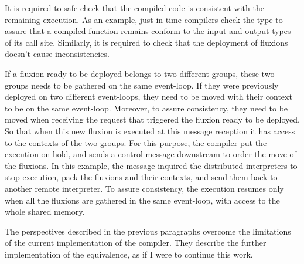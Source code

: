 It is required to safe-check that the compiled code is consistent with the remaining execution.
As an example, just-in-time compilers check the type to assure that a compiled function remains conform to the input and output types of its call site.
Similarly, it is required to check that the deployment of fluxions doesn't cause inconsistencies.

If a fluxion ready to be deployed belongs to two different groups, these two groups needs to be gathered on the same event-loop.
If they were previously deployed on two different event-loops, they need to be moved with their context to be on the same event-loop.
Moreover, to assure consistency, they need to be moved when receiving the request that triggered the fluxion ready to be deployed.
So that when this new fluxion is executed at this message reception it has access to the contexts of the two groups.
For this purpose, the compiler put the execution on hold, and sends a control message downstream to order the move of the fluxions.
In this example, the message inquired the distributed interpreters to stop execution, pack the fluxions and their contexts, and send them back to another remote interpreter.
To assure consistency, the execution resumes only when all the fluxions are gathered in the same event-loop, with access to the whole shared memory.



\separator

The perspectives described in the previous paragraphs overcome the limitations of the current implementation of the compiler.
They describe the further implementation of the equivalence, as if I were to continue this work.

